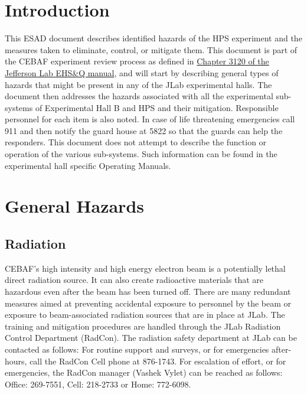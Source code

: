 
%
%
%

\chapter{Introduction}


This ESAD document describes identified hazards of the HPS experiment and the measures taken to eliminate, control, or mitigate them.
This document is part of the CEBAF experiment review process as defined in
\href{http://www.jlab.org/ehs/ehsmanual/manual/3120.html}{Chapter 3120 of the Jefferson Lab EHS\&Q manual},
and will start by describing general types of hazards that might be present in any of the  
JLab experimental halls.  The document then addresses the hazards associated 
with all the experimental sub-systems of Experimental Hall B and HPS and their 
mitigation.  Responsible personnel for each item is also noted.  
In case of life threatening 
emergencies call 911 and then notify the guard house at 5822 so that the guards can help
the responders.  This document does not attempt to describe the function 
or operation of the various sub-systems. Such information can be found in
the experimental hall specific Operating Manuals.


\chapter{General Hazards}

\section{Radiation}
	
CEBAF's high intensity and high energy electron beam is a potentially lethal direct radiation source. 
It can also create radioactive materials that are hazardous even  after the beam has been turned off. 
There are many redundant measures aimed at preventing accidental exposure to personnel by the beam 
or exposure to beam-associated radiation sources that are in place at JLab. The training and mitigation 
procedures are handled through the JLab Radiation Control Department (RadCon). The radiation safety 
department at JLab can be contacted as follows: For routine support and surveys, or for emergencies 
after-hours, call the RadCon Cell phone at 876-1743. For escalation of effort, or for emergencies, 
the RadCon manager (Vashek Vylet) can be reached as follows: Office: 269-7551, Cell: 218-2733 or Home: 772-6098.

